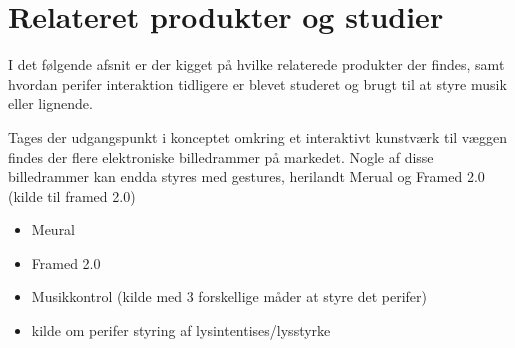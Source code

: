 \section{Relateret produkter og studier}
\label{RelateretProdukterOgStudier}

I det følgende afsnit er der kigget på hvilke relaterede produkter der findes, samt hvordan perifer interaktion tidligere er blevet studeret og brugt til at styre musik eller lignende.

Tages der udgangspunkt i konceptet omkring et interaktivt kunstværk til væggen findes der flere elektroniske billedrammer på markedet. Nogle af disse billedrammer kan endda styres med gestures, herilandt Merual \parencite{WEB:Meural} og Framed 2.0 (kilde til framed 2.0)



%
\begin{itemize}
  \item Meural \parencite{WEB:Meural}
  \item Framed 2.0 
  \item Musikkontrol (kilde med 3 forskellige måder at styre det perifer)
  \item kilde om perifer styring af lysintentises/lysstyrke
\end{itemize}
